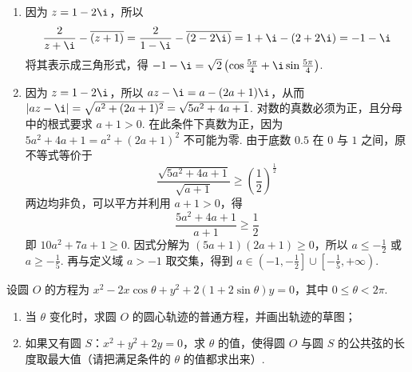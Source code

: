 \documentclass[UTF8,a4paper,oneside,11pt]{ctexbook}
\begin{document}
\begin{solution}
\begin{enumerate}
\item 因为 \(z = 1 - 2\i\)，所以
\[
\frac{2}{z + \i} - \overline{\left(z + 1\right)}
= \frac{2}{1 - \i} - \overline{\left(2 - 2\i\right)}
= 1 + \i - \left(2 + 2\i\right)
= -1 - \i
\]
将其表示成三角形式，得 \(-1 - \i = \sqrt{2}\left(\cos \frac{5\pi}{4} + \i \sin \frac{5\pi}{4}\right)\).

\item 因为 \(z=1-2\i\)，所以 \(az-\i=a-(2a+1)\i\)，从而 \(|az-\i|=\sqrt{a^2+(2a+1)^2}=\sqrt{5a^2+4a+1}\). 对数的真数必须为正，且分母中的根式要求 \(a+1>0\). 在此条件下真数为正，因为 \(5a^2+4a+1=a^2+(2a+1)^2\) 不可能为零. 由于底数 \(0.5\) 在 \(0\) 与 \(1\) 之间，原不等式等价于
\[
\frac{\sqrt{5a^2+4a+1}}{\sqrt{a+1}}\geqslant\left(\frac12\right)^{\frac{1}{2}}
\]
两边均非负，可以平方并利用 \(a+1>0\)，得
\[
\frac{5a^2+4a+1}{a+1}\geqslant\frac12
\]
即 \(10a^2+7a+1\geqslant0\). 因式分解为 \((5a+1)(2a+1)\geqslant0\)，所以 \(a\leqslant-\frac12\) 或 \(a\geqslant-\frac15\). 再与定义域 \(a>-1\) 取交集，得到 \(a\in\left(-1,-\frac12\right]\cup\left[-\frac15,+\infty\right)\).
\end{enumerate}
\end{solution}

\begin{problem}

设圆 \(O\) 的方程为 \(x^2 - 2x\cos \theta + y^2 + 2(1 + 2\sin \theta)y = 0\)，其中 \(0\leqslant\theta<2\pi\).

\begin{enumerate}
\item 当 \(\theta\) 变化时，求圆 \(O\) 的圆心轨迹的普通方程，并画出轨迹的草图；
\item 如果又有圆 \(S\)：\(x^2 + y^2 + 2y = 0\)，求 \(\theta\) 的值，使得圆 \(O\) 与圆 \(S\) 的公共弦的长度取最大值（请把满足条件的 \(\theta\) 的值都求出来）.
\end{enumerate}
\end{problem}
\end{document}
